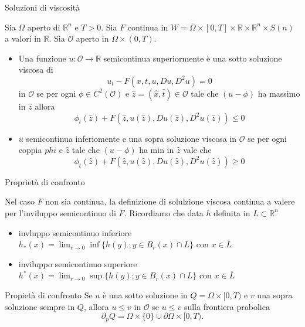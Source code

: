 \begin{frame}{Soluzioni di viscosità}
  \begin{definizione}
    Sia $\Omega$ aperto di $\mathbb{R}^n$ e $T>0$. Sia $F$ continua in
    $W=\overline{\Omega}\times
    [0,T]\times\mathbb{R}\times\mathbb{R}^n\times S(n)$ a valori in
    $\mathbb{R}$. Sia $\mathcal{O}$ aperto in $\Omega\times(0,T)$.
    \begin{itemize}
      \item Una funzione $u:\mathcal{O}\to\mathbb{R}$ semicontinua
        superiormente è una \alert{sotto
          soluzione viscosa} di 
        \[
        u_t-F(x,t,u,Du,D^2u)=0
        \]
        in $\mathcal{O}$ se per ogni $\phi\in C^2(\mathcal{O})$ e
        $\hat{z}=(\hat{x},\hat{t})\in\mathcal{O}$ tale che $(u-\phi)$ ha
        massimo in $\hat{z}$ allora
        \[
        \phi_t(\hat{z})+F(\hat{z},u(\hat{z}),Du(\hat{z}),D^2u(\hat{z}))\leq 0
        \]
        \item $u$ semicontinua inferiomente e una \alert{sopra
          soluzione viscosa}  in $\mathcal{O}$ se per ogni coppia
          $phi$ e $\hat{z}$ tale che $(u-\phi)$ ha min in $\hat{z}$
          vale che
          \[
          \phi_t(\hat{z})+F(\hat{z},u(\hat{z}),Du(\hat{z}),D^2u(\hat{z}))\geq 0
          \]
        \end{itemize}
  \end{definizione}
\end{frame}

\begin{frame}{Proprietà di confronto}
  \begin{osservazione}
    Nel caso $F$ non sia continua, la definizione di solulzione
    viscosa continua a valere per l'inviluppo semicontinuo di
    $F$. Ricordiamo che data $h$ definita in $L\subset\mathbb{R}^n$
    \begin{itemize}
    \item  invluppo semicontinuo inferiore $h_*(x)=\lim_{r\to
      0}\inf\{h(y); y\in B_r(x)\cap L\}$ con $x\in\overline{L}$
    \item inviluppo semicontinuo superiore $h^*(x)=\lim_{r\to
      0}\sup\{h(y);y\in B_r(x)\cap L\}$ con $x\in\overline{L}$
    \end{itemize}
  \end{osservazione}
  \begin{block}{Propietà di confronto}
    Se $u$ è una sotto soluzione in $Q=\Omega\times[0,T)$ e
      $v$ una sopra  soluzione sempre in $Q$,  allora $u\leq
      v$ in $\mathcal{O}$ se $u\leq v$ sulla frontiera prabolica 
    \[
    \partial_pQ=\Omega\times\{0\}\cup\partial\Omega\times[0,T).
    \]
  \end{block}
\end{frame}


